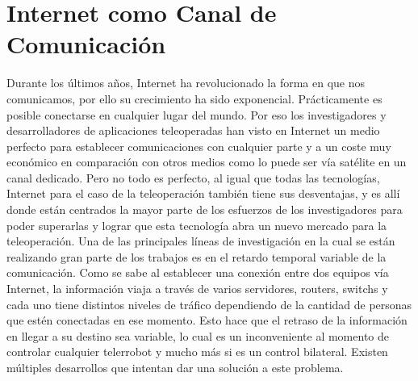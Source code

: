 \section*{Internet como Canal de Comunicación}
Durante los últimos años, Internet ha revolucionado la forma en que nos comunicamos, por ello su crecimiento ha sido exponencial. Prácticamente es posible conectarse en cualquier lugar del mundo. Por eso los investigadores y desarrolladores de aplicaciones teleoperadas han visto en Internet un medio perfecto para establecer comunicaciones con cualquier parte y a un coste muy económico en comparación con otros medios como lo puede ser vía satélite en un canal dedicado. Pero no todo es perfecto, al igual que todas las tecnologías, Internet para el caso de la teleoperación también tiene sus desventajas, y es allí donde están centrados la mayor parte de los esfuerzos de los investigadores para poder superarlas y lograr que esta tecnología abra un nuevo mercado para la teleoperación. Una de las principales líneas de investigación en la cual se están realizando gran parte de los trabajos es en el retardo temporal variable de la comunicación. Como se sabe al establecer una conexión entre dos equipos vía Internet, la información viaja a través de varios servidores, routers, switchs y cada uno tiene distintos niveles de tráfico dependiendo de la cantidad de personas que estén conectadas en ese momento. Esto hace que el retraso de la información en llegar a su destino sea variable, lo cual es un inconveniente al momento de controlar cualquier telerrobot y mucho más si es un control bilateral. Existen múltiples desarrollos que intentan dar una solución a este problema.%


